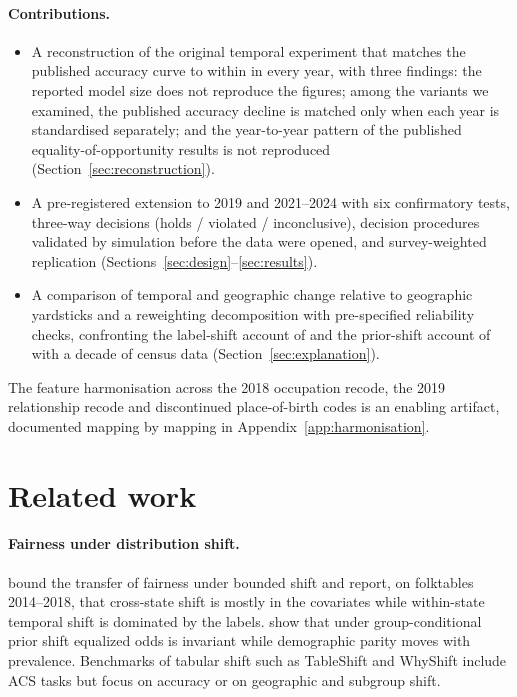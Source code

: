 \documentclass[10pt]{article}
\begin{document}
\paragraph{Contributions.}
\begin{itemize}
\item A reconstruction of the original temporal experiment that matches the published accuracy curve to within \AccMaxDevPerYear{} in every year, with three findings: the reported model size does not reproduce the figures; among the variants we examined, the published accuracy decline is matched only when each year is standardised separately; and the year-to-year pattern of the published equality-of-opportunity results is not reproduced (Section~\ref{sec:reconstruction}).
\item A pre-registered extension to 2019 and 2021--2024 with six confirmatory tests, three-way decisions (holds / violated / inconclusive), decision procedures validated by simulation before the data were opened, and survey-weighted replication (Sections~\ref{sec:design}--\ref{sec:results}).
\item A comparison of temporal and geographic change relative to geographic yardsticks and a reweighting decomposition with pre-specified reliability checks, confronting the label-shift account of \citet{chen2022fairness} and the prior-shift account of \citet{asiaee2026fairness} with a decade of census data (Section~\ref{sec:explanation}).
\end{itemize}
The feature harmonisation across the 2018 occupation recode, the 2019 relationship recode and discontinued place-of-birth codes is an enabling artifact, documented mapping by mapping in Appendix~\ref{app:harmonisation}.

\section{Related work}
\label{sec:related}

\paragraph{Fairness under distribution shift.}
\citet{chen2022fairness} bound the transfer of fairness under bounded shift and report, on folktables 2014--2018, that cross-state shift is mostly in the covariates while within-state temporal shift is dominated by the labels.
\citet{asiaee2026fairness} show that under group-conditional prior shift equalized odds is invariant while demographic parity moves with prevalence.
Benchmarks of tabular shift such as TableShift \citep{gardner2023tableshift} and WhyShift \citep{liu2023whyshift} include ACS tasks but focus on accuracy or on geographic and subgroup shift.
\end{document}
